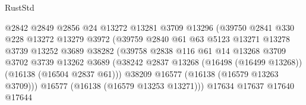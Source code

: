 \begin{lexlean}{RustStd}
\begin{coremodule}
                                        @2842
                                        @2849
                                        @2856
                                        @24
                                        @13272
                                        @13281
                                        @3709
                                        @13296
                                        (@39750
                                          @2841
                                          @330
                                          @228
                                          @13272
                                          @13279
                                          @3972
                                          (@39759
                                            @2840
                                            @61
                                            @63
                                            @5123
                                            @13271
                                            @13278
                                            @3739
                                            @13252
                                            @3689
                                            @38282
                                            (@39758
                                              @2838
                                              @116
                                              @61
                                              @14
                                              @13268
                                              @3709
                                              @3702
                                              @3739
                                              @13262
                                              @3689
                                              (@38242
                                                @2837
                                                @13268
                                                (@16498 (@16499 @13268))
                                                (@16138 (@16504 @2837 @61)))
                                              @38209
                                              @16577
                                              (@16138 (@16579 @13263 @3709)))
                                            @16577
                                            (@16138 (@16579 @13253 @13271)))
                                          @17634
                                          @17637
                                          @17640
                                          @17644

\end{coremodule}
\end{lexlean}
